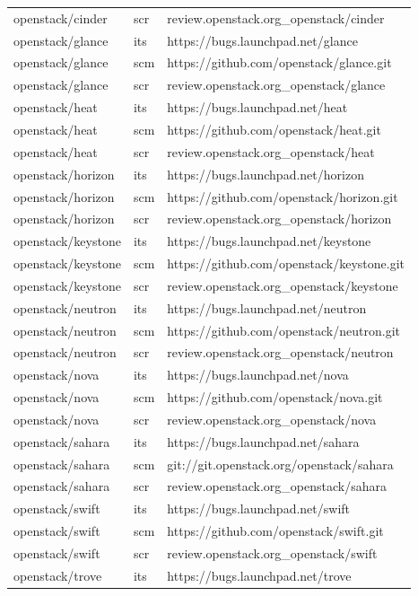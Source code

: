 \documentclass[a4wide,11pt]{report}
\begin{document}
\begin{center}
\begin{longtable}{|p{4cm}|p{1cm}|p{10cm}|}
openstack/cinder&scr&review.openstack.org\_openstack/cinder\\ 
openstack/glance&its&https://bugs.launchpad.net/glance\\ 
openstack/glance&scm&https://github.com/openstack/glance.git\\ 
openstack/glance&scr&review.openstack.org\_openstack/glance\\ 
openstack/heat&its&https://bugs.launchpad.net/heat\\ 
openstack/heat&scm&https://github.com/openstack/heat.git\\ 
openstack/heat&scr&review.openstack.org\_openstack/heat\\ 
openstack/horizon&its&https://bugs.launchpad.net/horizon\\ 
openstack/horizon&scm&https://github.com/openstack/horizon.git\\ 
openstack/horizon&scr&review.openstack.org\_openstack/horizon\\ 
openstack/keystone&its&https://bugs.launchpad.net/keystone\\ 
openstack/keystone&scm&https://github.com/openstack/keystone.git\\ 
openstack/keystone&scr&review.openstack.org\_openstack/keystone\\ 
openstack/neutron&its&https://bugs.launchpad.net/neutron\\ 
openstack/neutron&scm&https://github.com/openstack/neutron.git\\ 
openstack/neutron&scr&review.openstack.org\_openstack/neutron\\ 
openstack/nova&its&https://bugs.launchpad.net/nova\\ 
openstack/nova&scm&https://github.com/openstack/nova.git\\ 
openstack/nova&scr&review.openstack.org\_openstack/nova\\ 
openstack/sahara&its&https://bugs.launchpad.net/sahara\\ 
openstack/sahara&scm&git://git.openstack.org/openstack/sahara\\ 
openstack/sahara&scr&review.openstack.org\_openstack/sahara\\ 
openstack/swift&its&https://bugs.launchpad.net/swift\\ 
openstack/swift&scm&https://github.com/openstack/swift.git\\ 
openstack/swift&scr&review.openstack.org\_openstack/swift\\ 
openstack/trove&its&https://bugs.launchpad.net/trove\\ 

\end{longtable}
\end{center}
\end{document}
